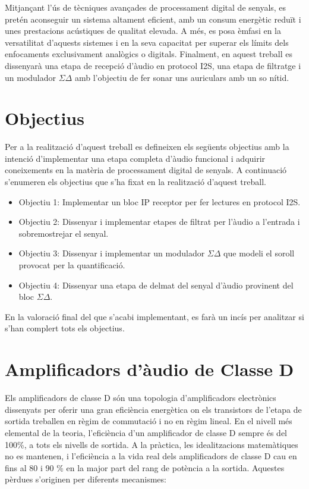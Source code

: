 \par Mitjançant l'ús de tècniques avançades de processament digital de senyals, es pretén aconseguir un sistema altament eficient, amb un consum energètic reduït i unes prestacions acústiques de qualitat elevada. A més, es posa èmfasi en la versatilitat d'aquests sistemes i en la seva capacitat per superar els límits dels enfocaments exclusivament analògics o digitals. Finalment, en aquest treball es dissenyarà una etapa de recepció d'àudio en protocol I2S, una etapa de filtratge i un modulador $\Sigma \Delta$ amb l'objectiu de fer sonar uns auriculars amb un so nítid.

\section{Objectius}
\par Per a la realització d'aquest treball es defineixen els següents objectius amb la intenció d'implementar una etapa completa d'àudio funcional i adquirir coneixements en la matèria de processament digital de senyals. A continuació s'enumeren els objectius que s'ha fixat en la realització d'aquest treball.
\begin{itemize}
    \item Objectiu 1: Implementar un bloc IP receptor per fer lectures en protocol I2S.
    \item Objectiu 2: Dissenyar i implementar etapes de filtrat per l'àudio a l'entrada i sobremostrejar el senyal.
    \item Objectiu 3: Dissenyar i implementar un modulador $\Sigma \Delta$ que modeli el soroll provocat per la quantificació.
    \item Objectiu 4: Dissenyar una etapa de delmat del senyal d'àudio provinent del bloc $\Sigma \Delta$.
\end{itemize}
\par En la valoració final del que s'acabi implementant, es farà un incís per analitzar si s'han complert tots els objectius. 

\section{Amplificadors d'àudio de Classe D}
\par Els amplificadors de classe D són una topologia d'amplificadors electrònics dissenyats per oferir una gran eficiència energètica on els transistors de l'etapa de sortida treballen en règim de commutació i no en règim lineal. En el nivell més elemental de la teoria, l'eficiència d'un amplificador de classe D sempre és del 100\%, a tots els nivells de sortida. A la pràctica, les idealitzacions matemàtiques no es mantenen, i l'eficiència a la vida real dels amplificadors de classe D cau en fins al 80 i 90 \% en la major part del rang de potència a la sortida. Aquestes pèrdues s'originen per diferents mecanismes: 

